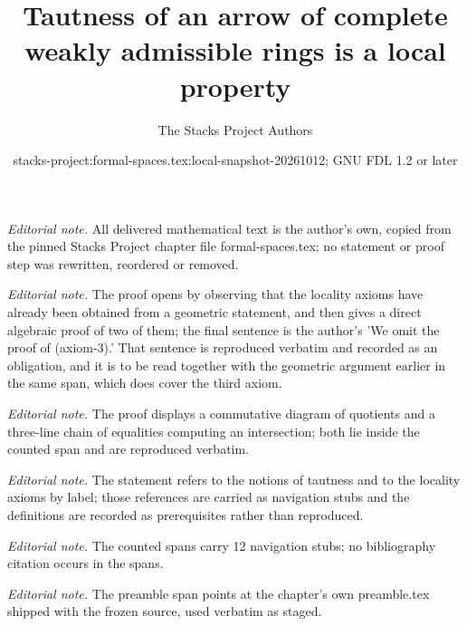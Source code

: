 \documentclass{stacks-project}
\title{Tautness of an arrow of complete weakly admissible rings is a local property}
\author{The Stacks Project Authors}
\date{stacks-project:formal-spaces.tex:local-snapshot-20261012; GNU FDL 1.2 or later}
\theoremstyle{plain}
\theoremstyle{definition}
\theoremstyle{remark}
\numberwithin{equation}{subsection}
\begin{document}
\maketitle
\noindent\textit{Editorial note.} All delivered mathematical text is the author's own, copied from the pinned Stacks Project chapter file formal-spaces.tex; no statement or proof step was rewritten, reordered or removed.\par\medskip
\noindent\textit{Editorial note.} The proof opens by observing that the locality axioms have already been obtained from a geometric statement, and then gives a direct algebraic proof of two of them; the final sentence is the author's 'We omit the proof of (axiom-3).' That sentence is reproduced verbatim and recorded as an obligation, and it is to be read together with the geometric argument earlier in the same span, which does cover the third axiom.\par\medskip
\noindent\textit{Editorial note.} The proof displays a commutative diagram of quotients and a three-line chain of equalities computing an intersection; both lie inside the counted span and are reproduced verbatim.\par\medskip
\noindent\textit{Editorial note.} The statement refers to the notions of tautness and to the locality axioms by label; those references are carried as navigation stubs and the definitions are recorded as prerequisites rather than reproduced.\par\medskip
\noindent\textit{Editorial note.} The counted spans carry 12 navigation stubs; no bibliography citation occurs in the spans.\par\medskip
\noindent\textit{Editorial note.} The preamble span points at the chapter's own preamble.tex shipped with the frozen source, used verbatim as staged.\par\medskip
\end{document}
